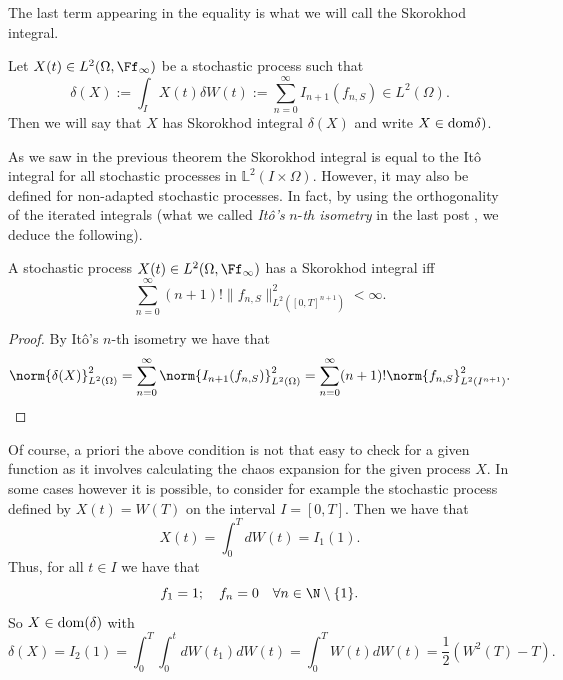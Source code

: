 \documentclass[
    a4paper,
    DIV=14,
    abstract=true,
    numbers=noenddot
]{scrartcl}
\begin{document}
The last term appearing in the equality is what we will call the Skorokhod integral.
\begin{definition}
	Let $X(t)\in L^2(\Omega,\Ff_\infty)$ be a  stochastic process such that
	\begin{equation*}
		\delta(X):=\int_{I} X(t)\delta W(t):=\sum_{n=0}^{\infty} I_{n+1}(f_{n,S})\in L^2(\Omega).
	\end{equation*}
	Then we will say that $X$ has Skorokhod integral $\delta(X)$ and write $X\in \rm{dom}
\delta)$.
\end{definition}
As we saw in the previous theorem the Skorokhod integral is equal to the Itô integral for all stochastic processes in $\mathbb{L}^2(I\times\Omega)$. However, it may also be defined for non-adapted stochastic processes. In fact, by using the orthogonality of the iterated integrals (what we called \emph{Itô's} $n$-\emph{th isometry} in the last post \cite{Chaosblog}, we deduce the following).
\begin{proposition}
	A stochastic process $X(t)\in L^2(\Omega,\Ff_\infty)$ has a Skorokhod integral iff
	\begin{equation*}
		\sum_{n=0}^{\infty} (n+1)!\|f_{n,S}\|^2_{L^2([0,T]^{n+1})}<\infty.
	\end{equation*}

\end{proposition}
\begin{proof}
	By Itô's $n$-th isometry we have that
	\begin{equation*}
		\norm{\delta(X)}^2_{L^2(\Omega)}=\sum_{n=0}^{\infty}  \norm{I_{n+1}(f_{n,S})}_{L^2(\Omega)}^2=\sum_{n=0}^{\infty} (n+1)!\norm{f_{n,S}}_{L^2(I^{n+1})}^2.
	\end{equation*}
\end{proof}
Of course, a priori the above condition is not that easy to check for a given function as it involves calculating the chaos expansion for the given process $X$. In some cases however it is possible, to consider for example the stochastic process defined by $X(t)=W(T)$ on the interval $I=[0,T]$. Then we have that
\begin{equation*}
	X(t)=\int_{0}^T dW(t)=I_1(1).
\end{equation*}
Thus, for all $t\in I$ we have that
\begin{equation*}
	f_1=1;\quad f_n=0\quad\forall n \in \N \setminus \{1\}  .
\end{equation*}
So $X\in \rm{dom}(\delta)$ with
\begin{equation*}
	\delta(X)= I_2(1)=\int_{0}^T\int_{0}^t dW(t_1)dW(t)=\int_{0}^T W(t) dW(t)= \frac{1}{2}(W^2(T)-T).
\end{equation*}
\end{document}
